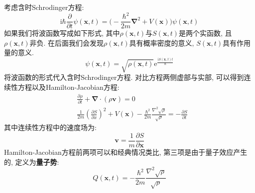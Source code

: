         考虑含时Schrodinger方程: 
        \begin{equation}
            \mathrm{i}\hbar \frac {\partial}{\partial t} \psi(\bm{x},t) = \bigg( - \frac {\hbar^2}{2m}\bm{\nabla}^2 + V(\bm{x})\bigg) \psi(\bm{x},t)
        \end{equation}
        如果我们将波函数写成如下形式, 其中$\rho(\bm{x},t)$与$S(\bm{x},t)$是两个实函数, 且$\rho(\bm{x},t)$非负. 在后面我们会发现$\rho(\bm{x},t)$具有概率密度的意义, $S(\bm{x},t)$具有作用量的意义. 
        \begin{equation}
            \psi(\bm{x},t) = \sqrt{\rho(\bm{x},t)} \mathrm{e}^{\frac {\mathrm{i}S(\bm{x},t)t}{\hbar}}
        \end{equation}
        将波函数的形式代入含时Schrodinger方程. 对比方程两侧虚部与实部, 可以得到连续性方程以及Hamilton-Jacobian方程: 
        \begin{equation}\begin{aligned}
            &\frac {\partial \rho}{\partial t} + \bm{\nabla} \cdot (\rho \bm{v}) = 0 \\
            &\frac {1}{2m}(\frac {\partial S}{\partial x})^2 + V(\bm{x}) - \frac {\hbar^2}{2m} \frac {\nabla^2 \sqrt{\rho}}{\sqrt{\rho}} = -\frac {\partial S}{\partial t}
        \end{aligned}\end{equation}
        其中连续性方程中的速度场为: 
        \begin{equation}
            \bm{v} = \frac 1m \frac {\partial S}{\partial \bm{x}}
        \end{equation}
        Hamilton-Jacobian方程前两项可以和经典情况类比, 第三项是由于量子效应产生的, 定义为\textbf{量子势}: 
        \begin{equation}
            Q(\bm{x},t) = - \frac {\hbar^2}{2m} \frac {\nabla^2 \sqrt{\rho}}{\sqrt{\rho}}
        \end{equation}

